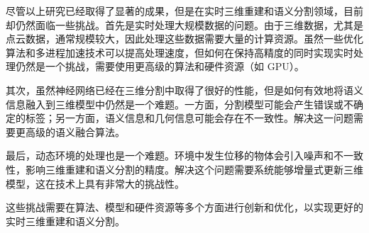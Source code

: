\par 尽管以上研究已经取得了显著的成果，但是在实时三维重建和语义分割领域，目前却仍然面临一些挑战。首先是实时处理大规模数据的问题。由于三维数据，尤其是点云数据，通常规模较大，因此处理这些数据需要大量的计算资源。虽然一些优化算法和多进程加速技术可以提高处理速度\cite{VoxelHashing,Real-TimeVolumetric,Multi-resolutionSurfaceReconstruction}，但如何在保持高精度的同时实现实时处理仍然是一个挑战，需要使用更高级的算法和硬件资源（如 GPU）\cite{GPUAccelerated}。

\par 其次，虽然神经网络已经在三维分割中取得了很好的性能，但是如何有效地将语义信息融入到三维模型中仍然是一个难题。一方面，分割模型可能会产生错误或不确定的标签；另一方面，语义信息和几何信息可能会存在不一致性。解决这一问题需要更高级的语义融合算法。

\par 最后，动态环境的处理也是一个难题。环境中发生位移的物体会引入噪声和不一致性，影响三维重建和语义分割的精度\cite{VideoPanopticSegmentation}。解决这个问题需要系统能够增量式更新三维模型，这在技术上具有非常大的挑战性。

\par 这些挑战需要在算法、模型和硬件资源等多个方面进行创新和优化，以实现更好的实时三维重建和语义分割。





